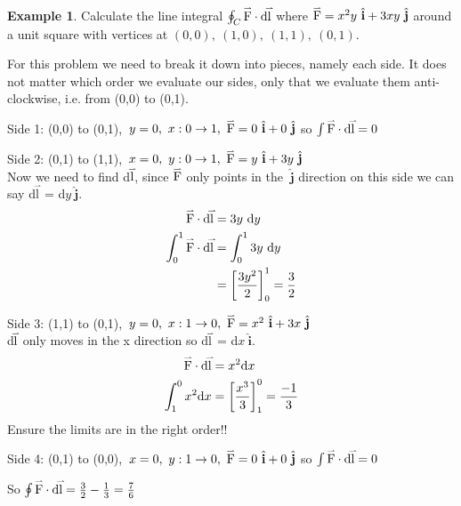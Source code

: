 \documentclass{article}
\newcommand{\ihat}{\ {\hat{\textbf{i}}}}
\newcommand{\jhat}{\ {\hat{\textbf{j}}}}
\renewcommand{\d}{\text{d}}
\renewcommand{\vec}[1]{\accentset{\rightharpoonup}{\text{#1}}}
\newcommand{\vecdot}[2]{\vec{#1}\cdot\d \vec{#2}}
\theoremstyle{definition}
\newtheorem{example}{Example}[section]
\begin{document}
\begin{example}
    Calculate the line integral $\oint_C \vec{F}\cdot \d\vec{l}$ where $\vec{F} = x^2y\ihat + 3xy\jhat$ around 
    a unit square with vertices at $(0,0),\ (1,0),\ (1,1),\ (0,1)$.
    \begin{center}
    \end{center}


    For this problem we need to break it down into pieces, namely each side. It does not matter which order 
    we evaluate our sides, only that we evaluate them anti-clockwise, i.e. from (0,0) to (0,1).

    Side 1: (0,0) to (0,1),\ $y = 0,\ x: 0 \rightarrow 1,\ \vec{F} = 0\ihat + 0\jhat$ so $\int \vecdot{F}{l} = 0$

    Side 2: (0,1) to (1,1),\ $x = 0,\ y: 0\rightarrow 1,\ \vec{F} = y\ihat + 3y\jhat$ \\
    Now we need to find d$\vec{l}$, since $\vec{F}$ only points in the $\jhat$ direction on this side we can say d$\vec{l}$ = d$y\jhat$.
    \begin{align*}
        \vecdot{F}{l} &= 3y\ \d y\\
        \int_0^1 \vecdot{F}{l} &= \int_0^1 3y\ \d y \\
        &= \left[\frac{3y^2}{2}\right]_0^1 = \frac{3}{2}
    \end{align*}

    Side 3: (1,1) to (0,1),\ $y = 0,\ x: 1\rightarrow 0,\ \vec{F} = x^2\ihat + 3x\jhat$\\
    d$\vec{l}$ only moves in the x direction so d$\vec{l}$ = d$x\ihat$.
    \begin{align*}
        \vecdot{F}{l} &= x^2\d x\\
        \int_1^0 x^2 \d x &= \left[\frac{x^3}{3}\right]_1^0 = \frac{-1}{3}
    \end{align*}
    Ensure the limits are in the right order!!

    Side 4: (0,1) to (0,0),\ $x = 0,\  y: 1\rightarrow 0,\ \vec{F} = 0\ihat + 0\jhat$ so $\int \vecdot{F}{l} = 0$

    So $\oint\vecdot{F}{l} = \frac{3}{2} - \frac{1}{3} = \frac{7}{6}$
\end{example}
\end{document}
